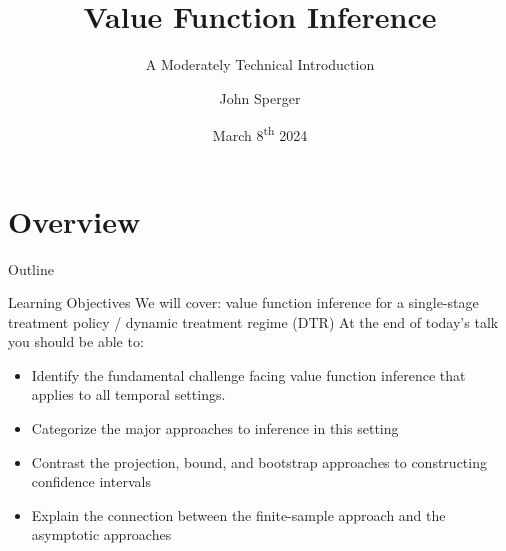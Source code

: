 \documentclass[aspectratio=169, professionalfonts]{beamer}
\author{John Sperger}
\date{March 8\textsuperscript{th} 2024}
\title{Value Function Inference}
\subtitle{A Moderately Technical Introduction}
\begin{document}
\maketitle

\section{Overview}
\begin{frame}{Outline}
	\tableofcontents[hideallsubsections]
\end{frame}
\begin{frame}[label={overview:objectives}]{Learning Objectives}
	We will cover: value function inference for a single-stage treatment policy /
	dynamic treatment regime (DTR)
	\vfill \pause
	At the end of today's talk you should be able to:
	\begin{itemize}
		\item Identify the fundamental challenge facing value function inference
		      that applies to all temporal settings.
		      \vfill \pause


		\item Categorize the major approaches to inference in this setting

		      \vfill \pause

		\item Contrast the projection, bound, and bootstrap approaches to constructing confidence intervals
		      \vfill \pause

		\item Explain the connection between the finite-sample approach and the
		      asymptotic approaches
	\end{itemize}
	\vfill
\end{frame}

\end{document}

